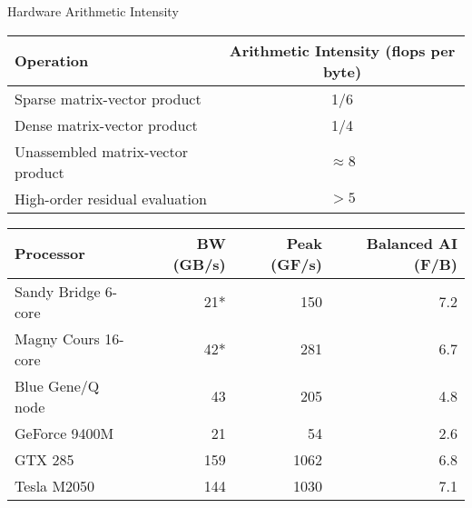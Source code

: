 \begin{frame}{Hardware Arithmetic Intensity}
  \begin{tabular}{lc}
    \toprule
    Operation                         & Arithmetic Intensity (flops per byte) \\
    \midrule
    Sparse matrix-vector product      & 1/6                  \\
    Dense matrix-vector product       & 1/4                  \\
    Unassembled matrix-vector product & $\approx 8$          \\
    High-order residual evaluation    & $> 5$                \\
    \bottomrule
  \end{tabular}
  \bigskip
  \begin{tabular}{lrrr}
    \toprule
    Processor           & BW (GB/s) & Peak (GF/s) & Balanced AI (F/B) \\
    \midrule
    Sandy Bridge 6-core & 21*       & 150         & 7.2                 \\
    Magny Cours 16-core & 42*       & 281         & 6.7                 \\
    Blue Gene/Q node    & 43        & 205         & 4.8                 \\
    GeForce 9400M       & 21        & 54          & 2.6                 \\
    GTX 285             & 159       & 1062        & 6.8                 \\
    Tesla M2050         & 144       & 1030        & 7.1                 \\
    \bottomrule
  \end{tabular}
\end{frame}
